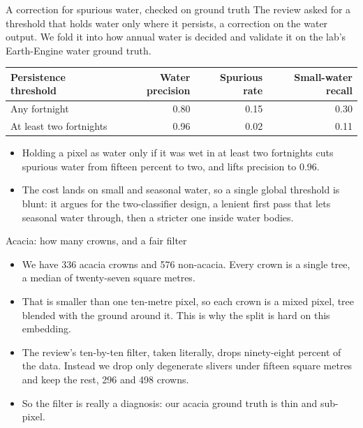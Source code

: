 \documentclass[aspectratio=169]{beamer}
\begin{document}
\begin{frame}{A correction for spurious water, checked on ground truth}
The review asked for a threshold that holds water only where it persists, a correction on the water
output. We fold it into how annual water is decided and validate it on the lab's Earth-Engine water
ground truth.
\begin{center}
\begin{tabular}{lrrr}
\toprule
Persistence threshold & Water precision & Spurious rate & Small-water recall \\
\midrule
Any fortnight & 0.80 & 0.15 & 0.30 \\
At least two fortnights & 0.96 & 0.02 & 0.11 \\
\bottomrule
\end{tabular}
\end{center}
\begin{itemize}\small
  \item Holding a pixel as water only if it was wet in at least two fortnights cuts spurious water from
  fifteen percent to two, and lifts precision to 0.96.
  \item The cost lands on small and seasonal water, so a single global threshold is blunt: it argues for
  the two-classifier design, a lenient first pass that lets seasonal water through, then a stricter one
  inside water bodies.
\end{itemize}
\end{frame}

\begin{frame}{Acacia: how many crowns, and a fair filter}
\begin{itemize}\small
  \item We have 336 acacia crowns and 576 non-acacia. Every crown is a single tree, a median of
  twenty-seven square metres.
  \item That is smaller than one ten-metre pixel, so each crown is a mixed pixel, tree blended with the
  ground around it. This is why the split is hard on this embedding.
  \item The review's ten-by-ten filter, taken literally, drops ninety-eight percent of the data. Instead
  we drop only degenerate slivers under fifteen square metres and keep the rest, 296 and 498 crowns.
  \item So the filter is really a diagnosis: our acacia ground truth is thin and sub-pixel.
\end{itemize}
\end{frame}
\end{document}
